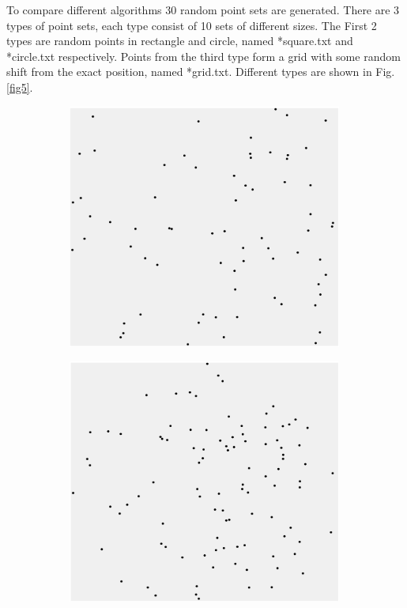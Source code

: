 \documentclass[conference]{IEEEtran}
\begin{document}
		To compare different algorithms 30 random point sets are generated.
		There are 3 types of point sets, each type consist of 10 sets of different sizes.
		The First 2 types are random points in rectangle and circle, named *{\textunderscore}square.txt and *{\textunderscore}circle.txt respectively.
		Points from the third type form a grid with some random shift from the exact position, named *{\textunderscore}grid.txt.
		Different types are shown in Fig. \ref{fig5}.
		
		\begin{figure}[htbp]
			\centering
			\begin{subfigure}{0.32\linewidth}
				\centering
				\includegraphics[width=0.99\textwidth]{fig5a.png}
				\caption{}
				\label{fig5a}
			\end{subfigure}
			\begin{subfigure}{0.32\linewidth}
				\centering
				\includegraphics[width=0.99\textwidth]{fig5b.png}

\end{subfigure}
\end{figure}
\end{document}
